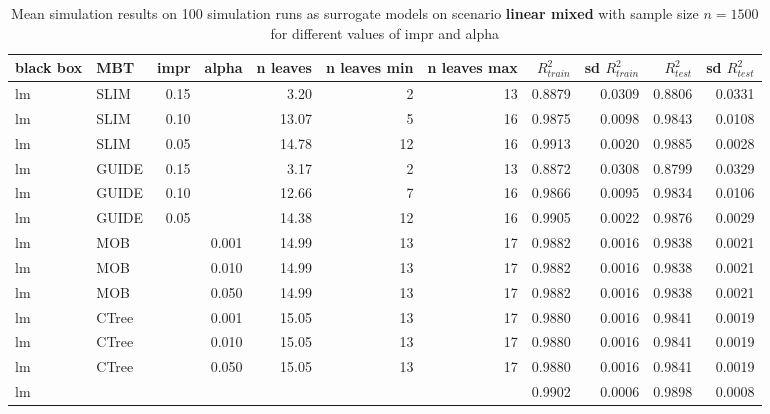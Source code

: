 \begin{table}[!htb]
\begin{tabular}[t]{l|l|r|r|r|r|r|r|r|r|r}
\end{tabular}
\label{tab:app_linear_abrupt_5000}

\end{table}




\begin{table}[!htb]

\caption{Mean simulation results on 100 simulation runs as surrogate models on scenario \textbf{linear mixed} with sample size $n=1500$ for different values of impr and alpha}
\centering \tiny
\begin{tabular}[t]{l|l|r|r|r|r|r|r|r|r|r}
\hline
black box & MBT & impr & alpha & n leaves & n leaves min & n leaves max &  $R^2_{train}$ & sd $R^2_{train}$ & $R^2_{test}$ & sd $R^2_{test}$\\
\hline
lm & SLIM & 0.15 & & 3.20 & 2 & 13 & 0.8879 & 0.0309 & 0.8806 & 0.0331\\
lm & SLIM & 0.10 & & 13.07 & 5 & 16 & 0.9875 & 0.0098 & 0.9843 & 0.0108\\
lm & SLIM & 0.05 & & 14.78 & 12 & 16 & 0.9913 & 0.0020 & 0.9885 & 0.0028\\
lm & GUIDE & 0.15 & & 3.17 & 2 & 13 & 0.8872 & 0.0308 & 0.8799 & 0.0329\\
lm & GUIDE & 0.10 & & 12.66 & 7 & 16 & 0.9866 & 0.0095 & 0.9834 & 0.0106\\
lm & GUIDE & 0.05 & & 14.38 & 12 & 16 & 0.9905 & 0.0022 & 0.9876 & 0.0029\\
lm & MOB & & 0.001 & 14.99 & 13 & 17 & 0.9882 & 0.0016 & 0.9838 & 0.0021\\
lm & MOB & & 0.010 & 14.99 & 13 & 17 & 0.9882 & 0.0016 & 0.9838 & 0.0021\\
lm & MOB & & 0.050 & 14.99 & 13 & 17 & 0.9882 & 0.0016 & 0.9838 & 0.0021\\
lm & CTree & & 0.001 & 15.05 & 13 & 17 & 0.9880 & 0.0016 & 0.9841 & 0.0019\\
lm & CTree & & 0.010 & 15.05 & 13 & 17 & 0.9880 & 0.0016 & 0.9841 & 0.0019\\
lm & CTree & & 0.050 & 15.05 & 13 & 17 & 0.9880 & 0.0016 & 0.9841 & 0.0019\\

\hline
lm & & & & & & & 0.9902 & 0.0006 & 0.9898 & 0.0008\\
\hline



\end{tabular}
\end{table}
